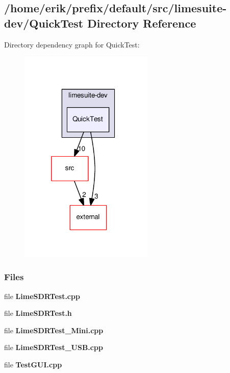 \subsection{/home/erik/prefix/default/src/limesuite-\/dev/\+Quick\+Test Directory Reference}
\label{dir_40baf299a20d0974a6085f1b93478328}
Directory dependency graph for Quick\+Test\+:
\nopagebreak
\begin{figure}[H]
\begin{center}
\leavevmode
\includegraphics[width=181pt]{dir_40baf299a20d0974a6085f1b93478328_dep}
\end{center}
\end{figure}
\subsubsection*{Files}
\begin{DoxyCompactItemize}
\item 
file {\bf Lime\+S\+D\+R\+Test.\+cpp}
\item 
file {\bf Lime\+S\+D\+R\+Test.\+h}
\item 
file {\bf Lime\+S\+D\+R\+Test\+\_\+\+Mini.\+cpp}
\item 
file {\bf Lime\+S\+D\+R\+Test\+\_\+\+U\+S\+B.\+cpp}
\item 
file {\bf Test\+G\+U\+I.\+cpp}
\end{DoxyCompactItemize}
